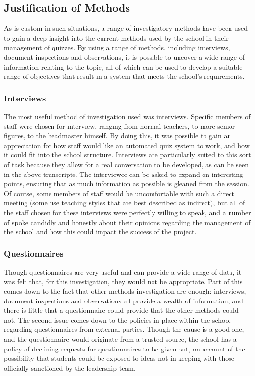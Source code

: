 \subsection{Justification of Methods} %
\label{sub:justification_of_methods}
As is custom in such situations, a range of investigatory methods have been used to gain a deep insight into the current methods used by the school in their management of quizzes. By using a range of methods, including interviews, document inspections and observations, it is possible to uncover a wide range of information relating to the topic, all of which can be used to develop a suitable range of objectives that result in a system that meets the school's requirements.

\subsubsection{Interviews} %
\label{ssub:interviews}
The most useful method of investigation used was interviews. Specific members of staff were chosen for interview, ranging from normal teachers, to more senior figures, to the headmaster himself. By doing this, it was possible to gain an appreciation for how staff would like an automated quiz system to work, and how it could fit into the school structure. Interviews are particularly suited to this sort of task because they allow for a real conversation to be developed, as can be seen in the above transcripts. The interviewee can be asked to expand on interesting points, ensuring that as much information as possible is gleaned from the session. Of course, some members of staff would be uncomfortable with such a direct meeting (some use teaching styles that are best described as indirect), but all of the staff chosen for these interviews were perfectly willing to speak, and a number of spoke candidly and honestly about their opinions regarding the management of the school and how this could impact the success of the project.

\subsubsection{Questionnaires} %
\label{ssub:questionnaires}
Though questionnaires are very useful and can provide a wide range of data, it was felt that, for this investigation, they would not be appropriate. Part of this comes down to the fact that other methods investigation are enough: interviews, document inspections and observations all provide a wealth of information, and there is little that a questionnaire could provide that the other methods could not. The second issue comes down to the policies in place within the school regarding questionnaires from external parties. Though the cause is a good one, and the questionnaire would originate from a trusted source, the school has a policy of declining requests for questionnaires to be given out, on account of the possibility that students could be exposed to ideas not in keeping with those officially sanctioned by the leadership team.
